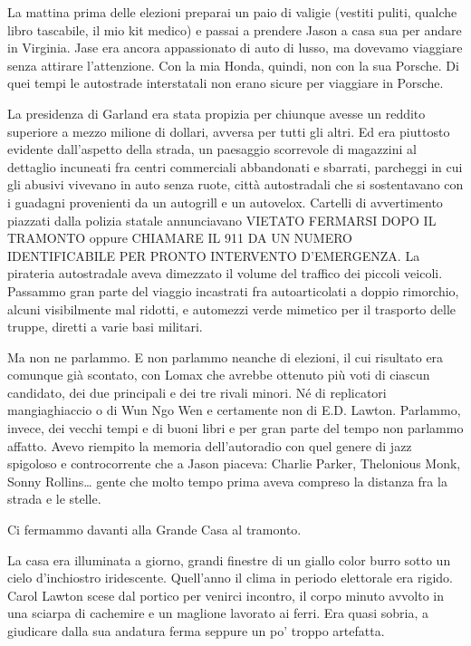 \separatorefiori

La mattina prima delle elezioni preparai un paio di valigie (vestiti
puliti, qualche libro tascabile, il mio kit medico) e passai a prendere
Jason a casa sua per andare in Virginia. Jase era ancora appassionato di
auto di lusso, ma dovevamo viaggiare senza attirare l'attenzione. Con la
mia Honda, quindi, non con la sua Porsche. Di quei tempi le autostrade
interstatali non erano sicure per viaggiare in Porsche.

La presidenza di Garland era stata propizia per chiunque avesse un
reddito superiore a mezzo milione di dollari, avversa per tutti gli
altri. Ed era piuttosto evidente dall'aspetto della strada, un paesaggio
scorrevole di magazzini al dettaglio incuneati fra centri commerciali
abbandonati e sbarrati, parcheggi in cui gli abusivi vivevano in auto
senza ruote, città autostradali che si sostentavano con i guadagni
provenienti da un autogrill e un autovelox. Cartelli di avvertimento
piazzati dalla polizia statale annunciavano {VIETATO FERMARSI DOPO IL
	TRAMONTO} oppure {CHIAMARE IL 911 DA UN NUMERO IDENTIFICABILE PER PRONTO
	INTERVENTO D'EMERGENZA}. La pirateria autostradale aveva dimezzato il
volume del traffico dei piccoli veicoli. Passammo gran parte del viaggio
incastrati fra autoarticolati a doppio rimorchio, alcuni visibilmente
mal ridotti, e automezzi verde mimetico per il trasporto delle truppe,
diretti a varie basi militari.

Ma non ne parlammo. E non parlammo neanche di elezioni, il cui risultato
era comunque già scontato, con Lomax che avrebbe ottenuto più voti di
ciascun candidato, dei due principali e dei tre rivali minori. Né di
replicatori mangiaghiaccio o di Wun Ngo Wen e certamente non di E.D.
Lawton. Parlammo, invece, dei vecchi tempi e di buoni libri e per gran
parte del tempo non parlammo affatto. Avevo riempito la memoria
dell'autoradio con quel genere di jazz spigoloso e controcorrente che a
Jason piaceva: Charlie Parker, Thelonious Monk, Sonny Rollins\ldots{}
gente che molto tempo prima aveva compreso la distanza fra la strada e
le stelle.

Ci fermammo davanti alla Grande Casa al tramonto.

La casa era illuminata a giorno, grandi finestre di un giallo color
burro sotto un cielo d'inchiostro iridescente. Quell'anno il clima in
periodo elettorale era rigido. Carol Lawton scese dal portico per
venirci incontro, il corpo minuto avvolto in una sciarpa di cachemire e
un maglione lavorato ai ferri. Era quasi sobria, a giudicare dalla sua
andatura ferma seppure un po' troppo artefatta.

